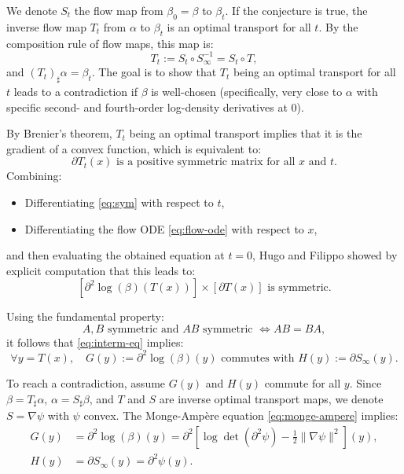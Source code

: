 \documentclass{article}
\begin{document}
We denote $S_t$ the flow map from $\beta_0 = \beta$ to $\beta_t$. If the conjecture is true, the inverse flow map $T_t$ from $\alpha$ to $\beta_t$ is an optimal transport for all $t$. By the composition rule of flow maps, this map is:
\begin{equation}
    T_t := S_t \circ S_\infty^{-1} = S_t \circ T,
\end{equation}
and $(T_t)_\sharp \alpha = \beta_t$. The goal is to show that $T_t$ being an optimal transport for all $t$ leads to a contradiction if $\beta$ is well-chosen (specifically, very close to $\alpha$ with specific second- and fourth-order log-density derivatives at 0).

By Brenier's theorem, $T_t$ being an optimal transport implies that it is the gradient of a convex function, which is equivalent to:
\begin{equation}\label{eq:sym}
    \partial T_t(x) \text{ is a positive symmetric matrix for all } x \text{ and } t. 
\end{equation}
Combining:
\begin{itemize}
\item Differentiating \eqref{eq:sym} with respect to $t$,
\item Differentiating the flow ODE \eqref{eq:flow-ode} with respect to $x$,
\end{itemize}
and then evaluating the obtained equation at $t = 0$, Hugo and Filippo showed by explicit computation that this leads to:
\begin{equation}\label{eq:interm-eq}
    [\partial^2 \log(\beta)(T(x))] \times [\partial T(x)] \text{ is symmetric.} 
\end{equation}

Using the fundamental property:
\[
    A, B \text{ symmetric and } AB \text{ symmetric } \iff AB = BA,
\]
it follows that \eqref{eq:interm-eq} implies:
\begin{equation}
    \forall y = T(x), \quad G(y) := \partial^2 \log(\beta)(y) \text{ commutes with } H(y) := \partial S_\infty(y).
\end{equation}

To reach a contradiction, assume $G(y)$ and $H(y)$ commute for all $y$. Since $\beta = T_\sharp \alpha$, $\alpha = S_\sharp \beta$, and $T$ and $S$ are inverse optimal transport maps, we denote $S = \nabla \psi$ with $\psi$ convex. The Monge-Ampère equation \eqref{eq:monge-ampere} implies:
\begin{align*}
    G(y) &= \partial^2 \log(\beta)(y) = \partial^2 \left[\log\det(\partial^2 \psi) - \frac{1}{2} \|\nabla \psi\|^2\right](y), \\
    H(y) &= \partial S_\infty(y) = \partial^2 \psi(y).
\end{align*}
\end{document}
